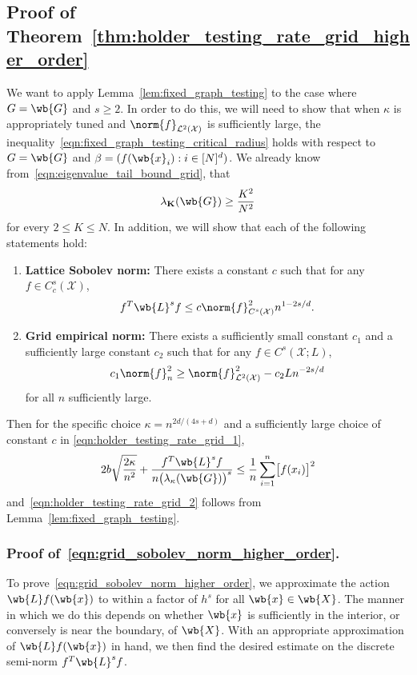 \documentclass{article}
\newcommand{\1}{\mathbf{1}}
\newcommand{\Xset}{\mathcal{X}}
\newcommand{\Leb}{\mathcal{L}}
\theoremstyle{alden}
\theoremstyle{aldenthm}
\theoremstyle{definition}
\theoremstyle{remark}
\begin{document}
\subsection{Proof of Theorem~\ref{thm:holder_testing_rate_grid_higher_order}}
\label{subsec:holder_testing_rate_grid_ho_pf}
We want to apply Lemma~\ref{lem:fixed_graph_testing} to the case where $G = \wb{G}$ and $s \geq 2$. In order to do this, we will need to show that when $\kappa$ is appropriately tuned and $\norm{f}_{\Leb^2(\mathcal{X})}$ is sufficiently large, the inequality~\eqref{eqn:fixed_graph_testing_critical_radius} holds with respect to $G = \wb{G}$ and $\beta = (f(\wb{x}_i): i \in [N]^d)$. We already know  from~\eqref{eqn:eigenvalue_tail_bound_grid}, that
\begin{equation*}
\lambda_{\mathbf{K}}(\wb{G}) \geq \frac{K^2}{N^2}
\end{equation*}
for every $2 \leq K \leq N$. In addition, we will show that each of the following statements hold:
\begin{enumerate}[label=(E\arabic*)]
	\item
	\textbf{Lattice Sobolev norm:}
	\label{event:grid_sobolev_norm_higher_order}
	There exists a constant $c$ such that for any $f \in C_c^s(\Xset)$,
	\begin{equation}
	\label{eqn:grid_sobolev_norm_higher_order}
	f^T \wb{L}^s f \leq c \norm{f}_{C^s(\Xset)}^2 n^{1 - 2s/d}.
	\end{equation}	
	\item 
	\textbf{Grid empirical norm:}
	\label{event:grid_empirical_norm_higher_order}
	There exists a sufficiently small constant $c_1$ and a sufficiently large constant $c_2$ such that for any $f \in C^s(\Xset;L)$,
	\begin{equation}
	\label{eqn:grid_empirical_norm_higher_order}
	c_1 \norm{f}_n^2 \geq \norm{f}_{\Leb^2(\Xset)}^2 - c_2 L n^{-2s/d}
	\end{equation}
	for all $n$ sufficiently large.
\end{enumerate}
Then for the specific choice $\kappa = n^{2d/(4s + d)}$ and a sufficiently large choice of constant $c$ in \eqref{eqn:holder_testing_rate_grid_1},
\begin{align*}
2b\sqrt{\frac{2\kappa}{n^2}} + \frac{f^T \wb{L}^s f}{n\bigl(\lambda_{\kappa}(\wb{G})\bigr)^s} \leq \frac{1}{n}\sum_{i = 1}^{n}\bigl[f(x_i)\bigr]^2
\end{align*}
and~\eqref{eqn:holder_testing_rate_grid_2} follows from Lemma~\ref{lem:fixed_graph_testing}.

\subsubsection{Proof of~\eqref{eqn:grid_sobolev_norm_higher_order}.}
To prove~\eqref{eqn:grid_sobolev_norm_higher_order}, we approximate the action $\wb{L}f(\wb{x})$ to within a factor of $h^s$ for all $\wb{x} \in \wb{X}$. The manner in which we do this depends on whether $\wb{x}$ is sufficiently in the interior, or conversely is near the boundary, of $\wb{X}$. With an appropriate approximation of $\wb{L} f(\wb{x})$ in hand, we then find the desired estimate on the discrete semi-norm $f^T \wb{L}^s f$.
\end{document}
